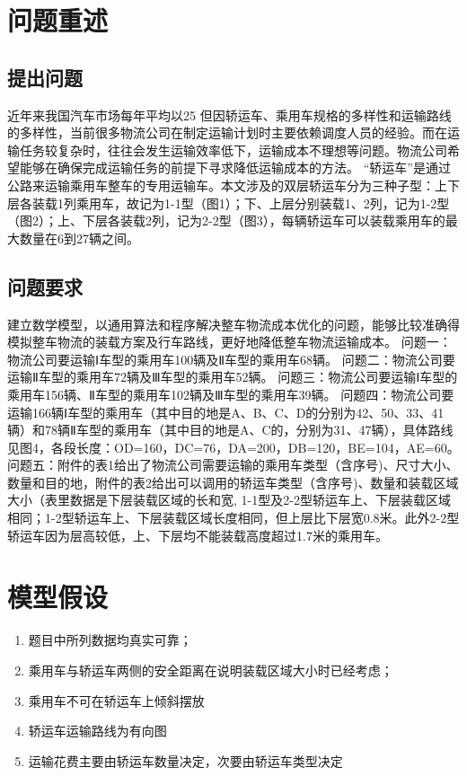 \documentclass[UTF8]{ctexart}
\begin{document}

\section{问题重述}
\subsection{提出问题}
	近年来我国汽车市场每年平均以25%
但因轿运车、乘用车规格的多样性和运输路线的多样性，当前很多物流公司在制定运输计划时主要依赖调度人员的经验。而在运输任务较复杂时，往往会发生运输效率低下，运输成本不理想等问题。物流公司希望能够在确保完成运输任务的前提下寻求降低运输成本的方法。
“轿运车”是通过公路来运输乘用车整车的专用运输车。本文涉及的双层轿运车分为三种子型：上下层各装载1列乘用车，故记为1-1型（图1）；下、上层分别装载1、2列，记为1-2型（图2）；上、下层各装载2列，记为2-2型（图3），每辆轿运车可以装载乘用车的最大数量在6到27辆之间。

\subsection{问题要求}
建立数学模型，以通用算法和程序解决整车物流成本优化的问题，能够比较准确得模拟整车物流的装载方案及行车路线，更好地降低整车物流运输成本。
问题一：物流公司要运输Ⅰ车型的乘用车100辆及Ⅱ车型的乘用车68辆。
问题二：物流公司要运输Ⅱ车型的乘用车72辆及Ⅲ车型的乘用车52辆。
问题三：物流公司要运输Ⅰ车型的乘用车156辆、Ⅱ车型的乘用车102辆及Ⅲ车型的乘用车39辆。
问题四：物流公司要运输166辆Ⅰ车型的乘用车（其中目的地是A、B、C、D的分别为42、50、33、41辆）和78辆Ⅱ车型的乘用车（其中目的地是A、C的，分别为31、47辆），具体路线见图4，各段长度：OD=160，DC=76，DA=200，DB=120，BE=104，AE=60。
问题五：附件的表1给出了物流公司需要运输的乘用车类型（含序号)、尺寸大小、数量和目的地，附件的表2给出可以调用的轿运车类型（含序号)、数量和装载区域大小（表里数据是下层装载区域的长和宽, 1-1型及2-2型轿运车上、下层装载区域相同；1-2型轿运车上、下层装载区域长度相同，但上层比下层宽0.8米。此外2-2型轿运车因为层高较低，上、下层均不能装载高度超过1.7米的乘用车。

\section{模型假设}
\begin{enumerate}
	\item 	题目中所列数据均真实可靠；
	\item	乘用车与轿运车两侧的安全距离在说明装载区域大小时已经考虑；
	\item	乘用车不可在轿运车上倾斜摆放
	\item	轿运车运输路线为有向图
	\item	运输花费主要由轿运车数量决定，次要由轿运车类型决定

\end{enumerate}
\end{document}
